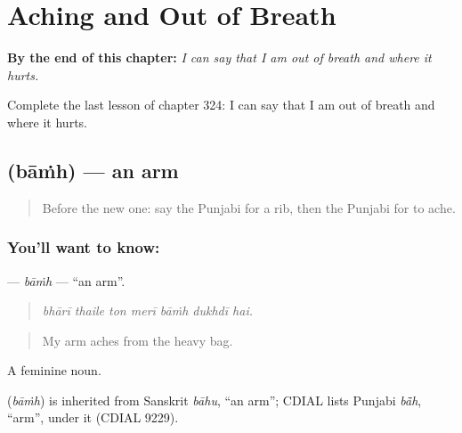 
\chapter{Aching and Out of Breath}
\label{ch:pa-a2-aching-and-out-of-breath}

\begin{chapteropening}
\textbf{By the end of this chapter:} \emph{I can say that I am out of breath and where it hurts.}

Complete the last lesson of chapter 324: I can say that I am out of breath and where it hurts.
\end{chapteropening}

\section[\texorpdfstring{\pa{ਬਾਂਹ} (bāṁh)}{ਬਾਂਹ (bāṁh)}]{ (bāṁh) — an arm}

\label{lesson:PA-C324-bamh}



\begin{quote}
Before the new one: say the Punjabi for a rib, then the Punjabi for to ache.
\end{quote}

\subsection*{You'll want to know: }
\textbf{} — \emph{bāṁh} — \textquotedblleft{}an arm\textquotedblright{}.

\begin{quote}
      
\end{quote}

\begin{quote}
\emph{bhārī thaile ton merī bāṁh dukhdī hai.}
\end{quote}

\begin{quote}
My arm aches from the heavy bag.
\end{quote}

A feminine noun.

\begin{cousinweb}
\textbf{} (\emph{bāṁh}) is inherited from Sanskrit \emph{bāhu}, \textquotedblleft{}an arm\textquotedblright{}; CDIAL lists Punjabi \emph{bā̃h}, \textquotedblleft{}arm\textquotedblright{}, under it (CDIAL 9229).
\end{cousinweb}

